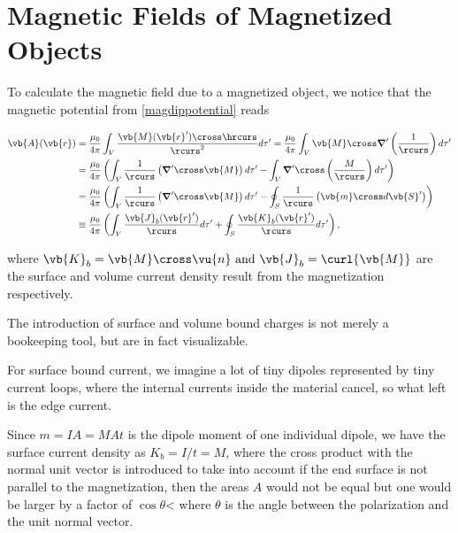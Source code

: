 \documentclass[english,a4paper,12pt]{report}
\begin{document}
\section{Magnetic Fields of Magnetized Objects}

To calculate the magnetic field due to a magnetized object, we notice that the magnetic potential from \cref{magdippotential} reads

\begin{equation}
    \begin{aligned} 
    \vb{A} (\vb{r} ) &= \frac{\mu_0}{4\pi} \int_{V}^{} \frac{\vb{M} (\vb{r} ') \cross \hrcurs }{\rcurs ^2} d\tau' = \frac{\mu_0}{4\pi} \int_{V}^{} \vb{M} \cross  \boldsymbol{\nabla}' \left( \frac{1}{\rcurs }  \right) d\tau '  \\
    &= \frac{\mu_0}{4\pi} \left(\int_{V}^{} \frac{1}{\rcurs } \left( \boldsymbol{\nabla}' \cross \vb{M}  \right)d\tau ' - \int_{V}^{} \boldsymbol{\nabla}' \cross \left( \frac{M}{\rcurs }  \right)d\tau '  \right) \\
    &= \frac{\mu_0}{4\pi} \left( \int_{V}^{} \frac{1}{\rcurs } \left( \boldsymbol{\nabla}' \cross \vb{M}  \right)d\tau ' - \oint_{S} \frac{1}{\rcurs }\left( \vb{m} \cross d\vb{S} ' \right)  \right) \\   
    &\equiv \frac{\mu_0}{4\pi} \left( \int_{V}^{} \frac{\vb{J} _{b}(\vb{r} ') }{\rcurs } d\tau ' + \oint_{S} \frac{\vb{K} _{b}(\vb{r} ') }{\rcurs }d\tau '    \right),
\end{aligned} 
\end{equation}

where \(\vb{K} _{b} = \vb{M} \cross \vu{n}   \text { and } \vb{J} _{b} = \curl{\vb{M} }  \) are the surface and volume current density result from the magnetization respectively.

The introduction of surface and volume bound charges is not merely a bookeeping tool, but are in fact visualizable.

For surface bound current, we imagine a lot of tiny dipoles represented by tiny current loops, where the internal currents inside the material cancel, so what left is the edge current. 

Since \(m = IA = MAt\) is the dipole moment of one individual dipole, we have the surface current density as \(K_{b} = I /t = M  \), where the cross product with the normal unit vector is introduced to take into account if the end surface is not parallel to the magnetization, then the areas \(A\) would not be equal but one would be larger by a factor of \(\cos \theta \)< where \(\theta \) is the angle between the polarization and the unit normal vector.
\end{document}
